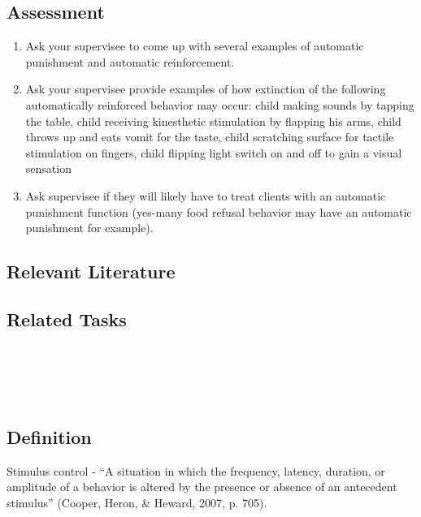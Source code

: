 \subsection{Assessment}
\begin{enumerate}
\item Ask your supervisee to come up with several examples of automatic punishment and automatic reinforcement. 
\item Ask your supervisee provide examples of how extinction of the following automatically reinforced behavior may occur: child making sounds by tapping the table, child receiving kinesthetic stimulation by flapping his arms, child throws up and eats vomit for the taste, child scratching surface for tactile stimulation on fingers, child flipping light switch on and off to gain a visual sensation
\item Ask supervisee if they will likely have to treat clients with an automatic punishment function (yes-many food refusal behavior may have an automatic punishment for example).
%
\end{enumerate}
%
\subsection{Relevant Literature}
\begin{refsection}
\nocite{test,alang2017police,clayton2018black}
\printbibliography[heading=none]
\end{refsection} 
%
\subsection{Related Tasks}
\fourFKSeventeen{}\\
\fourFKNineteen{}\\
\fourFKTwentyTwo{}\\
%
%
%
%
%
%
\section{\fourFKTwentyFour{}}
\subsection{Definition}
Stimulus control - ``A situation in which the frequency, latency, duration, or amplitude of a behavior is altered by the presence or absence of an antecedent stimulus'' (Cooper, Heron, \& Heward, 2007, p. 705).\\

